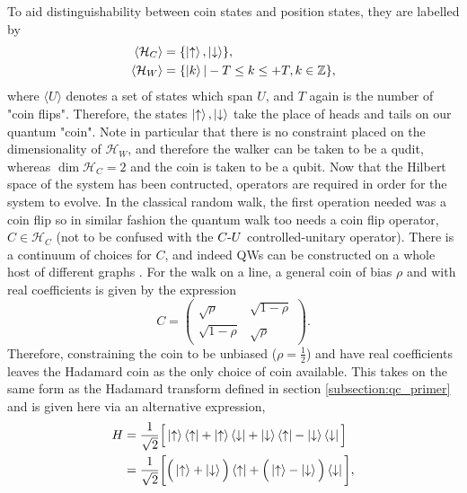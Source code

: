 To aid distinguishability between coin states and position states, they are labelled by
\begin{align}
    \langle\mathcal{H}_C\rangle &= \{\ket{\uparrow}, \ket{\downarrow}\},\\
    \langle\mathcal{H}_W\rangle &= \{\ket{k} | -T\leq k \leq +T, k\in\mathbb{Z}\},
\end{align}
where $\langle U \rangle$ denotes a set of states which span $U$, and $T$ again is the number of "coin flips".
Therefore, the states $\ket{\uparrow}, \ket{\downarrow}$ take the place of heads and tails on our quantum "coin". 
Note in particular that there is no constraint placed on the dimensionality of $\mathcal{H}_W$, and therefore the walker can be taken to be a qudit, whereas $\dim{\mathcal{H}_C} = 2$ and the coin is taken to be a qubit.
Now that the Hilbert space of the system has been contructed, operators are required in order for the system to evolve.
In the classical random walk, the first operation needed was a coin flip so in similar fashion the quantum walk too needs a coin flip operator, $C\in \mathcal{H}_C$ (not to be confused with the $C\text{-}U$ controlled-unitary operator).
There is a continuum of choices for $C$, and indeed QWs can be constructed on a whole host of different graphs \cite{Tregenna2003}. 
For the walk on a line, a general coin of bias $\rho$ and with real coefficients is given by the expression
\begin{equation}
    C =
    \begin{pmatrix}
        \sqrt{\rho} & \sqrt{1- \rho}\\
        \sqrt{1- \rho} & \sqrt{\rho}
    \end{pmatrix}.
    \label{eqn:general_coin}
\end{equation}
Therefore, constraining the coin to be unbiased ($\rho = \frac{1}{2}$) and have real coefficients leaves the Hadamard coin as the only choice of coin available.
This takes on the same form as the Hadamard transform defined in section \ref{subsection:qc_primer} and is given here via an alternative expression,
\begin{align}
    H &= \frac{1}{\sqrt{2}}\Big[
    \ket{\uparrow}\bra{\uparrow} +
    \ket{\uparrow}\bra{\downarrow} +
    \ket{\downarrow}\bra{\uparrow} -
    \ket{\downarrow}\bra{\downarrow}\Big]\\
    &= \frac{1}{\sqrt{2}}\bigg[\Big(\ket{\uparrow} + \ket{\downarrow}\Big)\bra{\uparrow} +
    \Big(\ket{\uparrow} - \ket{\downarrow}\Big)\bra{\downarrow}\bigg],
    \label{equation:hadamard_coin}
\end{align}
